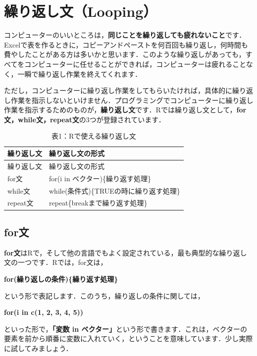 \documentclass[
  letterpaper,
  DIV=11,
  numbers=noendperiod]{scrreprt}
\begin{document}

\hypertarget{ux7e70ux308aux8fd4ux3057ux6587looping}{%
\chapter{繰り返し文（Looping）}\label{ux7e70ux308aux8fd4ux3057ux6587looping}}

コンピューターのいいところは，\textbf{同じことを繰り返しても疲れないこと}です．Excelで表を作るときに，コピーアンドペーストを何百回も繰り返し，何時間も費やしたことがある方は多いかと思います．このような繰り返しがあっても，すべてをコンピューターに任せることができれば，コンピューターは疲れることなく，一瞬で繰り返し作業を終えてくれます．

ただし，コンピューターに繰り返し作業をしてもらいたければ，具体的に繰り返し作業を指示しないといけません．プログラミングでコンピューターに繰り返し作業を指示するためのものが，\textbf{繰り返し文}です．Rでは繰り返し文として，\textbf{for文，while文，repeat文}の3つが登録されています．

\begin{longtable}[]{@{}ll@{}}
\caption{表1：Rで使える繰り返し文}\tabularnewline
\toprule()
繰り返し文 & 繰り返し文の形式 \\
\midrule()
\endfirsthead
\toprule()
繰り返し文 & 繰り返し文の形式 \\
\midrule()
\endhead
for文 & for(i in ベクター)\{繰り返す処理\} \\
while文 & while(条件式)\{TRUEの時に繰り返す処理\} \\
repeat文 & repeat\{breakまで繰り返す処理\} \\
\bottomrule()
\end{longtable}

\hypertarget{forux6587}{%
\section{for文}\label{forux6587}}

\textbf{for文}はRで，そして他の言語でもよく設定されている，最も典型的な繰り返し文の一つです．Rでは，for文は，

\textbf{for(繰り返しの条件)\{繰り返す処理\}}

という形で表記します．このうち，繰り返しの条件に関しては，

\textbf{for(i in c(1, 2, 3, 4, 5))}

といった形で，\textbf{「変数 in
ベクター」}という形で書きます．これは，ベクターの要素を前から順番に変数に入れていく，ということを意味しています．少し実際に試してみましょう．
\end{document}

